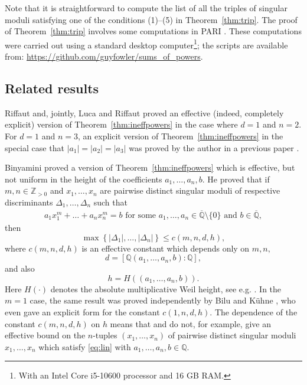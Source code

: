 \documentclass[11pt,a4paper, british]{amsart}
\theoremstyle{definition}
\theoremstyle{remark}
\numberwithin{equation}{section}
\newcommand{\alg}{\overline{\mathbb{Q}}} %
\newcommand{\Q}{\mathbb{Q}} %
\newcommand{\Z}{\mathbb{Z}} %
\begin{document}
Note that it is straightforward to compute the list of all the triples of singular moduli satisfying one of the conditions (1)--(5) in Theorem~\ref{thm:trip}. The proof of Theorem~\ref{thm:trip} involves some computations in PARI \cite{PARI24}. These computations were carried out using a standard desktop computer\footnote{With an Intel Core i5-10600 processor and 16 GB RAM.}; the scripts are available from: \url{https://github.com/guyfowler/sums_of_powers}. 
	
	\subsection{Related results}
	
		Riffaut \cite{Riffaut19} and, jointly, Luca and Riffaut \cite{LucaRiffaut19} proved an effective (indeed, completely explicit) version \cite[Theorem~1.3]{LucaRiffaut19} of Theorem~\ref{thm:ineffpowers} in the case where $d = 1$ and $n = 2$. For $d=1$ and $n = 3$, an explicit version of Theorem~\ref{thm:ineffpowers} in the special case that $\lvert a_1 \rvert = \lvert a_2 \rvert = \lvert a_3 \rvert$ was proved by the author in a previous paper \cite[Theorem~1.1]{Fowler23}. 
	
	Binyamini \cite{Binyamini19} proved a version of Theorem~\ref{thm:ineffpowers} which is effective, but not uniform in the height of the coefficients $a_1, \ldots, a_n, b$. He proved \cite[Corollary~4]{Binyamini19} that if $m, n \in \Z_{>0}$ and $x_1, \ldots, x_n$ are pairwise distinct singular moduli of respective discriminants $\Delta_1, \ldots, \Delta_n$ such that 
\begin{align}\label{eq:lin}
	a_1 x_1^m + \ldots + a_n x_n^m = b \mbox{ for some }
	a_1, \ldots, a_n \in \alg \setminus \{0\} \mbox{ and } b \in \alg,
\end{align}
then
\[ \max \left \{\left\lvert \Delta_1 \right\rvert, \ldots, \left\lvert \Delta_n \right\rvert \right\}\leq c(m, n, d, h),\]
where $c(m, n, d, h)$ is an effective constant which depends only on $m, n,$ 
\[ d = [\Q(a_1, \ldots, a_n, b) : \Q],\]
and also
\[ h = H((a_1, \ldots, a_n, b)).\]
Here $H(\cdot)$ denotes the absolute multiplicative Weil height, see e.g. \cite[\S1.5]{BombieriGubler06}. In the $m=1$ case, the same result was proved independently by Bilu and K\"uhne \cite[Lemma~3.1]{BiluKuhne20}, who even gave an explicit form \cite[(42)]{BiluKuhne20} for the constant $c(1, n, d, h)$. The dependence of the constant $c(m, n, d, h)$ on $h$ means that \cite[Corollary~4]{Binyamini19} and \cite[Lemma~3.1]{BiluKuhne20} do not, for example, give an effective bound on the $n$-tuples $(x_1, \ldots, x_n)$ of pairwise distinct singular moduli $x_1, \ldots, x_n$ which satisfy \eqref{eq:lin} with $a_1, \ldots, a_n, b \in \Q$. 
\end{document}
